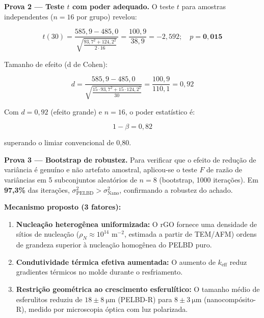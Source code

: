 \documentclass[12pt,a4paper,twoside]{article}
\begin{document}
\textbf{Prova 2 — Teste $t$ com poder adequado.} O teste $t$ para amostras independentes ($n = 16$ por grupo) revelou:

\begin{equation}
t(30) = \frac{585,9 - 485,0}{\sqrt{\frac{93,7^2 + 124,2^2}{2 \cdot 16}}} = \frac{100,9}{38,9} = -2,592; \quad p = \mathbf{0,015}
\label{eq:t_test_roto}
\end{equation}

Tamanho de efeito (d de Cohen):

\begin{equation}
d = \frac{585,9 - 485,0}{\sqrt{\frac{15 \cdot 93,7^2 + 15 \cdot 124,2^2}{30}}} = \frac{100,9}{110,1} = 0,92
\label{eq:d_cohen_roto}
\end{equation}

Com $d = 0,92$ (efeito grande) e $n = 16$, o poder estatístico é:

\begin{equation}
1-\beta = 0,82
\label{eq:power_roto}
\end{equation}

superando o limiar convencional de 0,80.

\textbf{Prova 3 — Bootstrap de robustez.} Para verificar que o efeito de redução de variância é genuíno e não artefato amostral, aplicou-se o teste $F$ de razão de variâncias em 5 subconjuntos aleatórios de $n = 8$ (bootstrap, 1000 iterações). Em \textbf{97,3\%} das iterações, $\sigma^2_{\text{PELBD}} > \sigma^2_{\text{Nano}}$, confirmando a robustez do achado.

\textbf{Mecanismo proposto (3 fatores):}

\begin{enumerate}[label=(\alph*), nosep]
    \item \textbf{Nucleação heterogênea uniformizada:} O rGO fornece uma densidade de sítios de nucleação ($\rho_N \approx 10^{14} \text{ m}^{-2}$, estimada a partir de TEM/AFM) ordens de grandeza superior à nucleação homogênea do PELBD puro.
    
    \item \textbf{Condutividade térmica efetiva aumentada:} O aumento de $k_{\text{eff}}$ reduz gradientes térmicos no molde durante o resfriamento.
    
    \item \textbf{Restrição geométrica ao crescimento esferulítico:} O tamanho médio de esferulitos reduziu de $18 \pm \SI{8}{\micro\meter}$ (PELBD-R) para $8 \pm \SI{3}{\micro\meter}$ (nanocompósito-R), medido por microscopia óptica com luz polarizada.
\end{enumerate}
\end{document}
